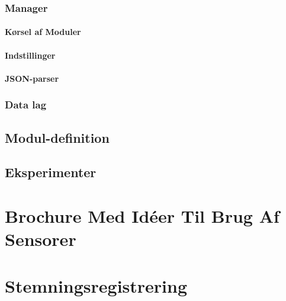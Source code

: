 \subsection{Manager}

\subsubsection{Kørsel af Moduler}

\subsubsection{Indstillinger}

\subsubsection{JSON-parser}\label{subsub:JSONparser}


\subsection{Data lag}


\section{Modul-definition}\label{modul_definition}


\section{Eksperimenter}




\label{bib:mybiblio}

\appendix



\chapter{Brochure Med Idéer Til Brug Af Sensorer}\label{app:brochure}
 

\chapter{Stemningsregistrering}


